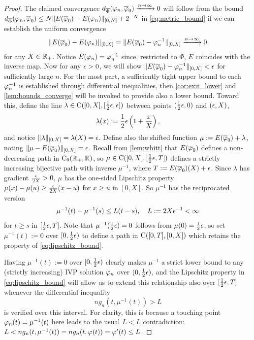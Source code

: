 \begin{proof}
    The claimed convergence $d_{\overline{\Phi}}(\varphi_n,\overline{\varphi}_0) \xrightarrow{n\to\infty} 0$ will follow from the bound $d_{\overline{\Phi}}(\varphi_n,\overline{\varphi}_0) \le N\Vert E(\overline{\varphi}_0) - E(\varphi_n) \Vert_{[0,N]} + 2^{-N}$ in \autoref{eq:metric_bound} if we can establish the uniform convergence~
    \begin{equation}
        \Vert E(\overline{\varphi}_0) - E(\varphi_n) \Vert_{[0,X]} = \Vert E(\overline{\varphi}_0) - \varphi^{-1}_n \Vert_{[0,X]} \xrightarrow{n\to\infty} 0
    \end{equation}
    for any $X\in\mathbb{R}_+$. Notice $E(\varphi_n)=\varphi^{-1}_n$ since, restricted to $\Phi$, $E$ coincides with the inverse map. Now for any $\epsilon>0$, we will show $\Vert E(\overline{\varphi}_0) - \varphi_n^{-1} \Vert_{[0,X]}< \epsilon$ for sufficiently large $n$. For the most part, a sufficiently tight upper bound to each $\varphi^{-1}_n$ is established through differential inequalities, then \autoref{cor:exit_lower} and \autoref{lem:bounds_converge} will be invoked to provide also a lower bound. Toward this, define the line $\lambda\in\mathrm{C}([0,X],[\frac12\epsilon,\epsilon])$ between points $(\frac12\epsilon,0)$ and $(\epsilon,X)$,
    \begin{equation}
        \lambda(x) := \frac12\epsilon\left(1 + \frac{x}{X}\right),
    \end{equation}
    and notice $\Vert\lambda\Vert_{[0,X]}=\lambda(X)=\epsilon$. Define also the shifted function $\mu := E(\overline{\varphi}_0) + \lambda$, noting $\Vert\mu - E(\overline{\varphi}_0)\Vert_{[0,X]} =\epsilon$. Recall from \autoref{lem:whitt} that $E(\overline{\varphi}_0)$ defines a non-decreasing path in $\mathrm{C}_0(\mathbb{R}_+,\mathbb{R})$, so $\mu\in\mathrm{C}([0,X],[\frac12\epsilon,T])$ defines a strictly increasing bijective path with inverse $\mu^{-1}$, where $T:=E(\overline{\varphi}_0)(X)+\epsilon$. Since $\lambda$ has gradient $\frac{\epsilon}{2X}>0$, $\mu$ has the one-sided Lipschitz property
    $\mu(x)-\mu(u)\ge\frac{\epsilon}{2X}(x-u)$ for $x\ge u$ in $[0,X]$. So $\mu^{-1}$ has the reciprocated version
    \begin{equation}\label{eq:lipschitz_bound}
        \mu^{-1}(t) - \mu^{-1}(s) \le L(t-s),\quad L:= 2X\epsilon^{-1} <\infty
    \end{equation}
    for $t\ge s$ in $[\frac12\epsilon,T]$. Note that $\mu^{-1}(\frac12\epsilon)=0$ follows from $\mu(0)=\frac12\epsilon$, so set $\mu^{-1}(t):=0$ over $[0,\frac12\epsilon)$ to define a path in $\mathrm{C}([0,T],[0,X])$ which retains the property of \autoref{eq:lipschitz_bound}.

    Having $\mu^{-1}(t):=0$ over $[0,\frac12\epsilon)$ clearly makes $\mu^{-1}$ a strict lower bound to any (strictly increasing) IVP solution $\varphi_n$ over $(0,\frac12\epsilon)$, and the Lipschitz property in \autoref{eq:lipschitz_bound} will allow us to extend this relationship also over $[\frac12\epsilon,T]$ whenever the differential inequality
    \begin{equation}\label{eq:ineq_bound}
        n g_n(t,\mu^{-1}(t)) > L
    \end{equation}
    is verified over this interval. For clarity, this is because a touching point $\varphi_n(t)=\mu^{-1}(t)$ here leads to the usual $L<L$ contradiction: $L < n g_n(t,\mu^{-1}(t)) = n g_n(t,\varphi(t)) = \varphi'(t) \le L$.


\end{proof}

